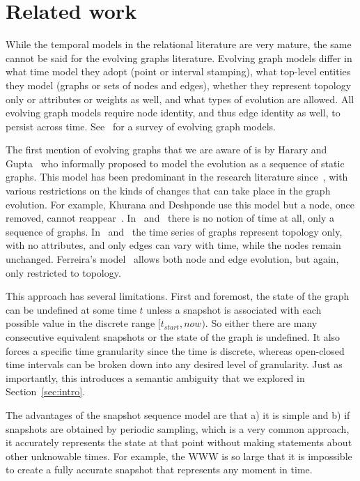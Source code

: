 \section{Related work}
\label{sec:related}

While the temporal models in the relational literature are very
mature, the same cannot be said for the evolving graphs literature.
Evolving graph models differ in what time model they adopt (point or
interval stamping), what top-level entities they model (graphs or sets
of nodes and edges), whether they represent topology only or
attributes or weights as well, and what types of evolution are
allowed.  All evolving graph models require node identity, and thus
edge identity as well, to persist across time.  See~\cite{Zaki2016}
for a survey of evolving graph models.

The first mention of evolving graphs that we are aware of is by Harary
and Gupta~\cite{Harary1997} who informally proposed to model the
evolution as a sequence of static graphs.  This model has been
predominant in the research literature
since~\cite{Borgwardt2006,Chan2008,Fard2012,Ferreira2004,Kan2009,Khurana2013,Lahiri2008,Lerman2010,Ren2011,Semertzidis2015,Sricharan2014,Yang2007},
with various restrictions on the kinds of changes that can take place
in the graph evolution.  For example, Khurana and Deshponde use this
model but a node, once removed, cannot reappear~\cite{Khurana2013}.
In~\cite{Ren2011} and~\cite{Fard2012} there is no notion of time at
all, only a sequence of graphs.  In~\cite{Borgwardt2006}
and~\cite{Kan2009} the time series of graphs represent topology only,
with no attributes, and only edges can vary with time, while the nodes
remain unchanged.  Ferreira's model~\cite{Ferreira2004} allows both
node and edge evolution, but again, only restricted to topology.

This approach has several limitations.  First and foremost, the state
of the graph can be undefined at some time $t$ unless a snapshot is
associated with each possible value in the discrete range $[t_{start},
  now)$.  So either there are many consecutive equivalent snapshots or
  the state of the graph is undefined.  It also forces a specific time
  granularity since the time is discrete, whereas open-closed time
  intervals can be broken down into any desired level of granularity.
  Just as importantly, this introduces a semantic ambiguity that we
  explored in Section~\ref{sec:intro}.

The advantages of the snapshot sequence model are that a) it is simple
and b) if snapshots are obtained by periodic sampling, which is a very
common approach, it accurately represents the state at that point
without making statements about other unknowable times.  For example,
the WWW is so large that it is impossible to create a fully accurate
snapshot that represents any moment in time.

